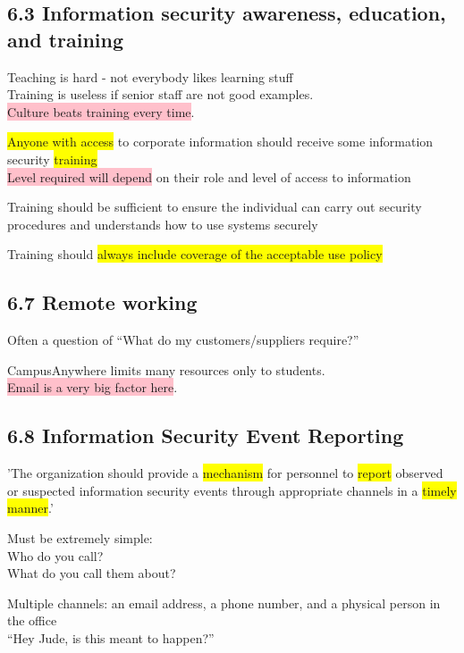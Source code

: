 \documentclass[tikz,border=10pt]{project_plan}
\begin{document}
\subsection{6.3 Information security awareness, education, and training}

Teaching is hard - not everybody likes learning stuff\\
Training is useless if senior staff are not good examples. \\
\colorbox{pink}{Culture beats training every time}.

\colorbox{yellow}{Anyone with access} to corporate information should receive some information security \colorbox{yellow}{training} \\
\colorbox{pink}{Level required will depend} on their role and level of access to information

Training should be sufficient to ensure the individual can carry out security
procedures and understands how to use systems securely

Training should \colorbox{yellow}{always include coverage of the acceptable use policy}

\subsection{6.7 Remote working}

Often a question of “What do my customers/suppliers require?”

CampusAnywhere limits many resources only to students. \\
\colorbox{pink}{Email is a very big factor here}.

\subsection{6.8 Information Security Event Reporting}

'The organization should provide a \colorbox{yellow}{mechanism} for personnel to \colorbox{yellow}{report} observed
or suspected information security events through appropriate channels in a \colorbox{yellow}{timely manner}.'

Must be extremely simple:\\
Who do you call? \\
What do you call them about?

Multiple channels: an email address, a phone number, and a physical person in the office\\
“Hey Jude, is this meant to happen?”
\end{document}
